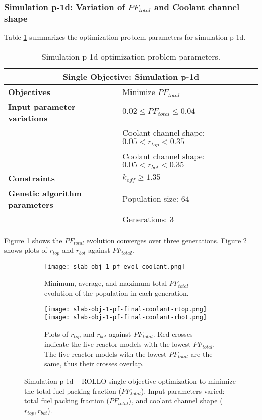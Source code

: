 \subsubsection{Simulation p-1d: Variation of $PF_{total}$ and Coolant channel shape}
Table \ref{tab:simulationp1d} summarizes the optimization problem parameters for 
simulation p-1d.  
\begin{table}[htbp!]
    \centering
    \onehalfspacing
    \caption{Simulation p-1d optimization problem parameters.}
	\label{tab:simulationp1d}
    \footnotesize
    \begin{tabular}{l|p{6.5cm}}
    \hline 
    \multicolumn{2}{c}{\textbf{Single Objective: Simulation p-1d}} \\
    \hline 
    \textbf{Objectives} & Minimize $PF_{total}$\\
    \hline 
    \textbf{Input parameter variations} & $0.02 \leq PF_{total} \leq 0.04$ \\
    & Coolant channel shape: $0.05<r_{top}<0.35$ \\
    & Coolant channel shape: $0.05<r_{bot}<0.35$ \\
    \hline
    \textbf{Constraints} & $k_{eff} \geq 1.35$\\ 
    \hline 
    \textbf{Genetic algorithm parameters} & Population size: 64 \\
    & Generations: 3 \\
    \hline
    \end{tabular}
\end{table}
Figure \ref{fig:slab-obj-1-pf-evol-coolant} shows the $PF_{total}$ evolution converges 
over three generations.  
Figure \ref{fig:slab-obj-1-pf-final-coolant} shows plots of $r_{top}$ and $r_{bot}$ 
against $PF_{total}$.  
\begin{figure}[htbp!]
    \centering
    \begin{subfigure}{\textwidth}
        \texttt{[image: slab-obj-1-pf-evol-coolant.png]}
        \caption{Minimum, average, and maximum total $PF_{total}$ evolution of the 
        population in each generation.}
        \label{fig:slab-obj-1-pf-evol-coolant} 
    \end{subfigure}
    \begin{subfigure}{\textwidth}
        \texttt{[image: slab-obj-1-pf-final-coolant-rtop.png]}
        \texttt{[image: slab-obj-1-pf-final-coolant-rbot.png]}
        \caption{Plots of $r_{top}$ and $r_{bot}$ against $PF_{total}$. 
        Red crosses indicate the five reactor models with the lowest $PF_{total}$.
        The five reactor models with the lowest $PF_{total}$ are the same, thus 
        their crosses overlap.}
        \label{fig:slab-obj-1-pf-final-coolant} 
    \end{subfigure}
    \caption{Simulation p-1d -- ROLLO single-objective optimization to minimize 
    the total fuel packing fraction ($PF_{total}$). 
    Input parameters varied: total fuel packing fraction 
    ($PF_{total}$), and coolant channel shape ($r_{top}, r_{bot}$).}
    \label{fig:slab-obj-1-pf-coolant}
\end{figure}
